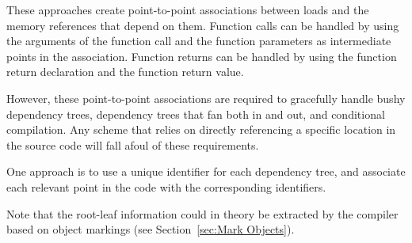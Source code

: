 These approaches create point-to-point associations between
 loads and the memory references that depend
on them.
Function calls can be handled by using the arguments of the function
call and the function parameters as intermediate points in the
association.
Function returns can be handled by using the function return
declaration and the function return value.

However, these point-to-point associations are required to gracefully handle
bushy dependency trees, dependency trees that fan both in and out,
and conditional compilation.
Any scheme that relies on directly referencing a specific location
in the source code will fall afoul of these requirements.

One approach is to use a unique identifier for each dependency tree,
and associate each relevant point in the code with the corresponding
identifiers.

Note that the root-leaf information could in theory be extracted by
the compiler based on object markings
(see Section~\ref{sec:Mark Objects}).
